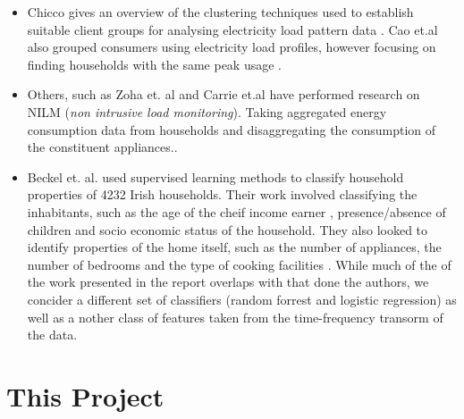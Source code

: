 \begin{itemize}
\item Chicco gives an overview of the clustering techniques used to establish suitable client groups for analysing electricity load pattern data \cite{Chicco}. Cao et.al also grouped consumers using electricity load profiles, however focusing on finding households with the same peak usage \cite{Cao}. 
\item Others, such as Zoha et. al and Carrie et.al have performed research on NILM (\textit{non intrusive load monitoring}). Taking aggregated energy consumption data from households and disaggregating the consumption of the constituent appliances.\cite{Zoha}\cite{Carrie}. 
 
\item Beckel et. al. used supervised learning methods to classify household properties of 4232 Irish households. Their work involved classifying the inhabitants, such as the age of the cheif income earner , presence/absence of children and socio economic status of the household. They also looked to identify properties of the home itself, such as the number of appliances, the number of bedrooms and the type of cooking facilities \cite{Beckel 3}. While much of the of the work presented in the report overlaps with that done the authors, we concider a different set of classifiers (random forrest and logistic regression) as well as a nother class of features taken from the time-frequency transorm of the data.
\end{itemize}


\section{This Project}
